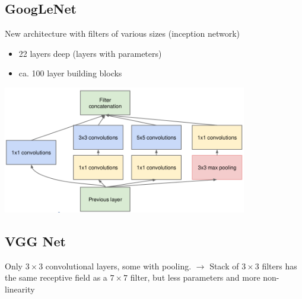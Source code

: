 \subsection{GoogLeNet}
\begin{minipage}{0.5\textwidth}
    New architecture with filters of various sizes (inception network)
    \begin{itemize}
        \item 22 layers deep (layers with parameters)
        \item ca. 100 layer building blocks
    \end{itemize}
\end{minipage}
\begin{minipage}{0.5\textwidth}
    \centering
    \includegraphics[width=0.8\textwidth]{sections/NetworkArchitectures/img/googlenet_various_sizes}
\end{minipage}

\subsection{VGG Net}
Only $3\times 3$ convolutional layers, some with pooling. $\rightarrow$ Stack of $3\times 3$ filters has the same receptive field as a $7\times 7$ filter, but less parameters and more non-linearity


